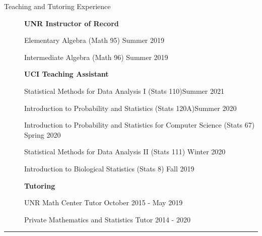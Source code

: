 \documentclass{article}
\begin{document}
\begin{description}
	\vspace{-2mm}
	\item[Teaching and Tutoring Experience]\hspace*{.1in} 
	
		\textbf{UNR Instructor of Record}
			
			\setlength{\leftskip}{0.5cm}
			
			Elementary Algebra (Math 95) \hfill{Summer 2019}
			\vspace*{1mm}
			
			Intermediate Algebra (Math 96) \hfill{Summer 2019}
			\vspace*{1mm}
			
			\setlength{\leftskip}{0cm}
	
		\textbf{UCI Teaching Assistant}
		
			\setlength{\leftskip}{0.5cm}
			
			Statistical Methods for Data Analysis I (Stats 110)\hfill{Summer 2021}
			\vspace*{1mm}
			
			Introduction to Probability and Statistics (Stats 120A)\hfill{Summer 2020}
			\vspace*{1mm}
			
			Introduction to Probability and Statistics for Computer Science (Stats 67) \hfill{Spring 2020}
			\vspace*{1mm}
			
			Statistical Methods for Data Analysis II (Stats 111) \hfill{Winter 2020}
			\vspace*{1mm}
			
			Introduction to Biological Statistics (Stats 8) \hfill{Fall 2019}
			\vspace*{1mm}
			
			\setlength{\leftskip}{0cm}
			
		\textbf{Tutoring}
		
			\setlength{\leftskip}{0.5cm}
			UNR Math Center Tutor \hfill{October 2015 - May 2019}
			\vspace*{1mm}
			
			Private Mathematics and Statistics Tutor \hfill{2014 - 2020}
		
			
\end{description}
\vspace{-2mm}
\rule{\linewidth}{1pt}


\end{document}
